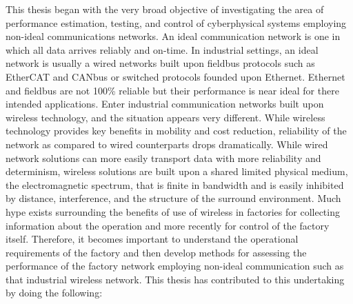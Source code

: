 This thesis began with the very broad objective of investigating the area of performance estimation, testing, and control of cyberphysical systems employing non-ideal communications networks.  An ideal communication network is one in which all data arrives reliably and on-time.  In industrial settings, an ideal network is usually a wired networks built upon fieldbus protocols such as EtherCAT and CANbus or switched protocols founded upon Ethernet.  Ethernet and fieldbus are not 100\% reliable but their performance is near ideal for there intended applications.  Enter industrial communication networks built upon wireless technology, and the situation appears very different.  While wireless technology provides key benefits in mobility and cost reduction, reliability of the network as compared to wired counterparts drops dramatically.  While wired network solutions can more easily transport data with more reliability and determinism, wireless solutions are built upon a shared limited physical medium, the electromagnetic spectrum, that is finite in bandwidth and is easily inhibited by distance, interference, and the structure of the surround environment.  Much hype exists surrounding the benefits of use of wireless in factories for collecting information about the operation and more recently for control of the factory itself.  Therefore, it becomes important to understand the operational requirements of the factory and then develop methods for assessing the performance of the factory network employing non-ideal communication such as that industrial wireless network.  This thesis has contributed to this undertaking by doing the following:

